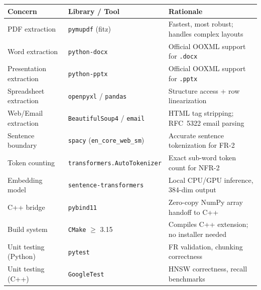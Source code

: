 \documentclass[12pt, a4paper]{article}
\begin{document}
\begin{tcolorbox}[standardbox, colback=white, colframe=ctPurple, leftrule=4pt]
\begin{center}
\small
\begin{tabular}{@{} l l p{5.2cm} @{}}
    \toprule
    \textbf{Concern} & \textbf{Library / Tool} & \textbf{Rationale} \\
    \midrule
    PDF extraction
        & \texttt{pymupdf} (fitz)
        & Fastest, most robust; handles complex layouts \\
    \addlinespace
    Word extraction
        & \texttt{python-docx}
        & Official OOXML support for \texttt{.docx} \\
    \addlinespace
    Presentation extraction
        & \texttt{python-pptx}
        & Official OOXML support for \texttt{.pptx} \\
    \addlinespace
    Spreadsheet extraction
        & \texttt{openpyxl} / \texttt{pandas}
        & Structure access + row linearization \\
    \addlinespace
    Web/Email extraction
        & \texttt{BeautifulSoup4} / \texttt{email}
        & HTML tag stripping; RFC~5322 email parsing \\
    \addlinespace
    Sentence boundary
        & \texttt{spacy} (\texttt{en\_core\_web\_sm})
        & Accurate sentence tokenization for FR-2 \\
    \addlinespace
    Token counting
        & \texttt{transformers.AutoTokenizer}
        & Exact sub-word token count for NFR-2 \\
    \addlinespace
    Embedding model
        & \texttt{sentence-transformers}
        & Local CPU/GPU inference, 384-dim output \\
    \addlinespace
    C++ bridge
        & \texttt{pybind11}
        & Zero-copy NumPy array handoff to C++ \\
    \addlinespace
    Build system
        & \texttt{CMake} $\geq$ 3.15
        & Compiles C++ extension; no installer needed \\
    \addlinespace
    Unit testing (Python)
        & \texttt{pytest}
        & FR validation, chunking correctness \\
    \addlinespace
    Unit testing (C++)
        & \texttt{GoogleTest}
        & HNSW correctness, recall benchmarks \\
    \bottomrule
\end{tabular}
\end{center}
\end{tcolorbox}
\end{document}
